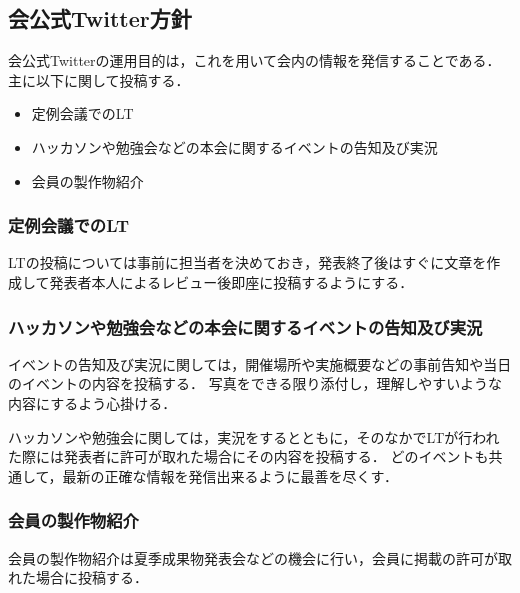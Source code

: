 \subsection*{会公式Twitter方針}



会公式Twitterの運用目的は，これを用いて会内の情報を発信することである．
主に以下に関して投稿する．

\begin{itemize}
\item 定例会議でのLT
\item ハッカソンや勉強会などの本会に関するイベントの告知及び実況
\item 会員の製作物紹介
\end{itemize}

\subsubsection*{定例会議でのLT}
LTの投稿については事前に担当者を決めておき，発表終了後はすぐに文章を作成して発表者本人によるレビュー後即座に投稿するようにする．

\subsubsection*{ハッカソンや勉強会などの本会に関するイベントの告知及び実況}
イベントの告知及び実況に関しては，開催場所や実施概要などの事前告知や当日のイベントの内容を投稿する．
写真をできる限り添付し，理解しやすいような内容にするよう心掛ける．

ハッカソンや勉強会に関しては，実況をするとともに，そのなかでLTが行われた際には発表者に許可が取れた場合にその内容を投稿する．
どのイベントも共通して，最新の正確な情報を発信出来るように最善を尽くす．

\subsubsection*{会員の製作物紹介}
会員の製作物紹介は夏季成果物発表会などの機会に行い，会員に掲載の許可が取れた場合に投稿する．

